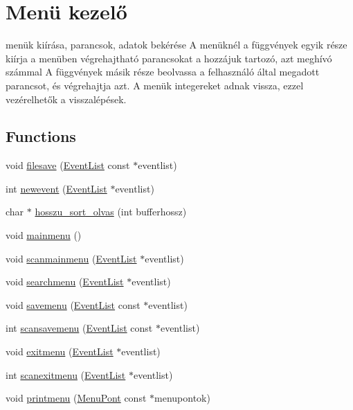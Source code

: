 \hypertarget{group__menu}{}\section{Menü kezelő}
\label{group__menu}


menük kiírása, parancsok, adatok bekérése A menüknél a függvények egyik része kiírja a menüben végrehajtható parancsokat a hozzájuk tartozó, azt meghívó számmal A függvények másik része beolvassa a felhasználó által megadott parancsot, és végrehajtja azt. A menük integereket adnak vissza, ezzel vezérelhetők a visszalépések.  


\subsection*{Functions}
\begin{DoxyCompactItemize}
\item 
void \hyperlink{group__menu_ga6ee903116c3ec27e1a4680b08e6647e2}{filesave} (\hyperlink{struct_event_list}{Event\+List} const $\ast$eventlist)
\item 
int \hyperlink{group__menu_ga069c1b762e46bba28b1f38b87d8d58aa}{newevent} (\hyperlink{struct_event_list}{Event\+List} $\ast$eventlist)
\item 
char $\ast$ \hyperlink{group__menu_gab9ac014b764791c1dc71c187dca898f7}{hosszu\+\_\+sort\+\_\+olvas} (int bufferhossz)
\item 
void \hyperlink{group__menu_gac86d3169260f5cacd0f792743957b054}{mainmenu} ()
\item 
void \hyperlink{group__menu_ga8e572ab27981dcd7144340fd25a24c80}{scanmainmenu} (\hyperlink{struct_event_list}{Event\+List} $\ast$eventlist)
\item 
void \hyperlink{group__menu_ga38d64ff02f60ebcb1988655ea12540a6}{searchmenu} (\hyperlink{struct_event_list}{Event\+List} $\ast$eventlist)
\item 
void \hyperlink{group__menu_ga1e8bbce91606e9498fafa46cf96477d0}{savemenu} (\hyperlink{struct_event_list}{Event\+List} const $\ast$eventlist)
\item 
int \hyperlink{group__menu_gadaafbda0a45084d074a4d210ec37efac}{scansavemenu} (\hyperlink{struct_event_list}{Event\+List} const $\ast$eventlist)
\item 
void \hyperlink{group__menu_gac651d3838f4da7bf6055fa839621e289}{exitmenu} (\hyperlink{struct_event_list}{Event\+List} $\ast$eventlist)
\item 
int \hyperlink{group__menu_gaa12eba16d2e2bd5dfc70240d19bd5c8e}{scanexitmenu} (\hyperlink{struct_event_list}{Event\+List} $\ast$eventlist)
\item 
void \hyperlink{group__menu_gac95f6c8c1de4749a4ae8fb342329e6dc}{printmenu} (\hyperlink{struct_menu_pont}{Menu\+Pont} const $\ast$menupontok)
\end{DoxyCompactItemize}


